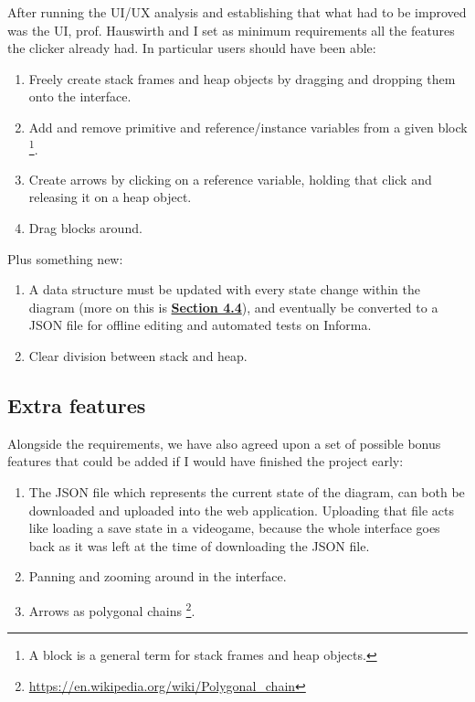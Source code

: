 \documentclass[]{usiinfbachelorproject}
\begin{document}
After running the UI/UX analysis and establishing that what had to be improved was the UI, prof. Hauswirth and I set as minimum requirements all the features the clicker already had. In particular users should have been able:

\begin{enumerate}
	\item Freely create stack frames and heap objects by dragging and dropping them onto the interface.
	\item Add and remove primitive and reference/instance variables from a given block \footnote{A block is a general term for stack frames and heap objects.}.
	\item Create arrows by clicking on a reference variable, holding that click and releasing it on a heap object.
	\item Drag blocks around.
\end{enumerate}

\noindent Plus something new:

\begin{enumerate}
	\item A data structure must be updated with every state change within the diagram (more on this is \hyperref[storing states]{\textbf{Section 4.4}}), and eventually be converted to a JSON file for offline editing and automated tests on Informa.
	\item Clear division between stack and heap.
\end{enumerate}

\subsection{Extra features}

Alongside the requirements, we have also agreed upon a set of possible bonus features that could be added if I would have finished the project early:

\begin{enumerate}
	\item The JSON file which represents the current state of the diagram, can both be downloaded and uploaded into the web application. Uploading that file acts like loading a save state in a videogame, because the whole interface goes back as it was left at the time of downloading the JSON file.
	\item Panning and zooming around in the interface.
	\item Arrows as polygonal chains \footnote{\url{https://en.wikipedia.org/wiki/Polygonal_chain}}.
\end{enumerate}
\end{document}
